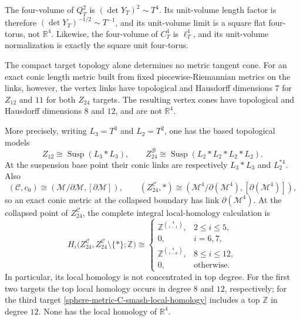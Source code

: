 \begin{corollary}
\label{sphere-metric-unit-volume}
The four-volume of \(Q_T^2\) is \((\det Y_T)^2\sim T^4\).  Its unit-volume
length factor is therefore \((\det Y_T)^{-1/2}\sim T^{-1}\), and its
unit-volume limit is a square flat four-torus, not \(\mathbb R^4\).
Likewise, the four-volume of \(C_T^4\) is \(\ell_T^4\), and its unit-volume
normalization is exactly the square unit four-torus.
\end{corollary}

\begin{proposition}
\label{sphere-metric-tangent-scope}
The compact target topology alone determines no metric tangent cone.
For an exact conic length metric built from fixed piecewise-Riemannian
metrics on the links, however, the vertex links have topological and
Hausdorff dimensions \(7\) for \(Z_{12}\) and \(11\) for both
\(Z_{24}\) targets.  The resulting vertex cones have topological and
Hausdorff dimensions \(8\) and \(12\), and are not \(\mathbb R^4\).

More precisely, writing \(L_3=T^3\) and \(L_2=T^2\), one has the based
topological models
\[
 Z_{12}\cong\operatorname{Susp}(L_3*L_3),
 \qquad
 Z_{24}^{\mathcal B}
 \cong\operatorname{Susp}(L_2*L_2*L_2*L_2).
\]
At the suspension base point their conic links are respectively
\(L_3*L_3\) and \(L_2^{*4}\).  Also
\[
 (\mathcal C,c_0)
 \cong
 (\mathcal M/\partial\mathcal M,[\partial\mathcal M]),
 \qquad
 (Z_{24}^{\mathcal C},*)
 \cong
 (\mathcal M^4/\partial(\mathcal M^4),
  [\partial(\mathcal M^4)]),
\]
so an exact conic metric at the collapsed boundary has link
\(\partial(\mathcal M^4)\).  At the collapsed point of
\(Z_{24}^{\mathcal C}\), the complete integral local-homology calculation is
\begin{equation}
 H_i\bigl(Z_{24}^{\mathcal C},
          Z_{24}^{\mathcal C}\setminus\{*\};\mathbb Z\bigr)
 \cong
 \begin{cases}
  \mathbb Z^{\binom4{i-1}},&2\leq i\leq5,\\
  0,&i=6,7,\\
  \mathbb Z^{\binom4{i-8}},&8\leq i\leq12,\\
  0,&\text{otherwise}.
 \end{cases}
 \label{sphere-metric-C-smash-local-homology}
\end{equation}
In particular, its local homology is not concentrated in top degree.  For
the first two targets the top local homology occurs in degree \(8\) and
\(12\), respectively; for the third target
\eqref{sphere-metric-C-smash-local-homology} includes a top
\(\mathbb Z\) in degree \(12\).  None has the local homology of
\(\mathbb R^4\).


\end{proposition}
